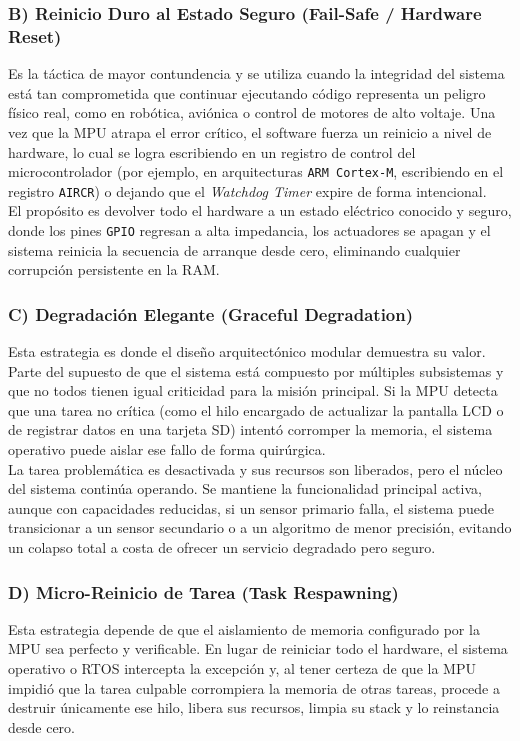 \documentclass[12pt,letterpaper]{article}
\begin{document}
\subsubsection*{B) Reinicio Duro al Estado Seguro (Fail-Safe / Hardware Reset)}
Es la táctica de mayor contundencia y se utiliza cuando la integridad del sistema está tan comprometida que
continuar ejecutando código representa un peligro físico real, como en robótica, aviónica o control de motores
de alto voltaje. Una vez que la MPU atrapa el error crítico, el software fuerza un reinicio a nivel de hardware,
lo cual se logra escribiendo en un registro de control del microcontrolador (por ejemplo, en arquitecturas
\texttt{ARM Cortex-M}, escribiendo en el registro \texttt{AIRCR}) o dejando que el \textit{Watchdog Timer} expire
de forma intencional.\\
 
El propósito es devolver todo el hardware a un estado eléctrico conocido y seguro, donde los pines \texttt{GPIO}
regresan a alta impedancia, los actuadores se apagan y el sistema reinicia la secuencia de arranque desde cero,
eliminando cualquier corrupción persistente en la RAM.
 
\subsubsection*{C) Degradación Elegante (Graceful Degradation)} 
Esta estrategia es donde el diseño arquitectónico modular demuestra su valor. Parte del supuesto de que el
sistema está compuesto por múltiples subsistemas y que no todos tienen igual criticidad para la misión principal.
Si la MPU detecta que una tarea no crítica (como el hilo encargado de actualizar la pantalla LCD o de registrar
datos en una tarjeta SD) intentó corromper la memoria, el sistema operativo puede aislar ese fallo de forma
quirúrgica.\\
 
La tarea problemática es desactivada y sus recursos son liberados, pero el núcleo del sistema continúa operando.
Se mantiene la funcionalidad principal activa, aunque con capacidades reducidas, si un sensor primario falla, el
sistema puede transicionar a un sensor secundario o a un algoritmo de menor precisión, evitando un colapso total
a costa de ofrecer un servicio degradado pero seguro.
 
\subsubsection*{D) Micro-Reinicio de Tarea (Task Respawning)}
Esta estrategia depende de que el aislamiento de memoria configurado por la MPU sea perfecto y verificable.
En lugar de reiniciar todo el hardware, el sistema operativo o RTOS intercepta la excepción y, al tener certeza
de que la MPU impidió que la tarea culpable corrompiera la memoria de otras tareas, procede a destruir únicamente
ese hilo, libera sus recursos, limpia su stack y lo reinstancia desde cero.\\
 
\end{document}
